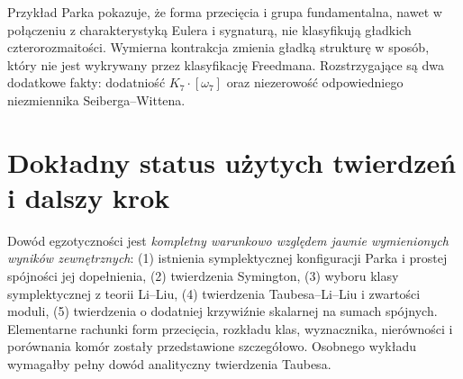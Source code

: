 \begin{center}
\end{center}

\begin{uwaga}
Przykład Parka pokazuje, że forma przecięcia i grupa
fundamentalna, nawet w połączeniu z charakterystyką Eulera
i sygnaturą, nie klasyfikują gładkich czterorozmaitości.
Wymierna kontrakcja zmienia gładką strukturę w sposób,
który nie jest wykrywany przez klasyfikację Freedmana.
Rozstrzygające są dwa dodatkowe fakty: dodatniość
$K_7\cdot[\omega_7]$ oraz niezerowość odpowiedniego
niezmiennika Seiberga--Wittena.
\end{uwaga}

\section{Dokładny status użytych twierdzeń i dalszy krok}
\label{sec:tg-park14-status}

Dowód egzotyczności jest \emph{kompletny warunkowo względem
jawnie wymienionych wyników zewnętrznych}:
(1) istnienia symplektycznej konfiguracji Parka i prostej
spójności jej dopełnienia, (2) twierdzenia Symington,
(3) wyboru klasy symplektycznej z teorii Li--Liu,
(4) twierdzenia Taubesa--Li--Liu i zwartości moduli,
(5) twierdzenia o dodatniej krzywiźnie skalarnej
na sumach spójnych.
Elementarne rachunki form przecięcia, rozkładu klas,
wyznacznika, nierówności i porównania komór zostały
przedstawione szczegółowo. Osobnego wykładu wymagałby
pełny dowód analityczny twierdzenia Taubesa.

